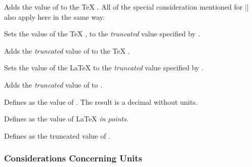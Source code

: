 \begin{command}{\pgfmathaddtolength{}}
  Adds the value of  to the \TeX{}
  . All of the special consideration mentioned for
  |\pgfmathsetlength| also apply here in the same way.
\end{command}

\begin{command}{\pgfmathsetcount{}}
  Sets the value of the \TeX{} , to the
  \emph{truncated} value specified by .
\end{command}

\begin{command}{\pgfmathaddtocount{}}
  Adds the \emph{truncated} value  of  to the \TeX{}
  .
\end{command}

\begin{command}{\pgfmathsetcounter{}}
  Sets the value of the \LaTeX{}  to the \emph{truncated}
  value specified by .
\end{command}

\begin{command}{\pgfmathaddtocounter{}}
  Adds the \emph{truncated} value  of  to
  .
\end{command}

\begin{command}{\pgfmathsetmacro{}}
  Defines  as the  value of . The result
  is a decimal without units.
\end{command}

\begin{command}{\pgfmathsetlengthmacro{}}
  Defines  as the value of 
  \LaTeX{} \emph{in points}.
\end{command}

\begin{command}{\pgfmathtruncatemacro{}}
  Defines  as the truncated value of .
\end{command}


\subsubsection{Considerations Concerning Units}
\label{pgfmath-units}

